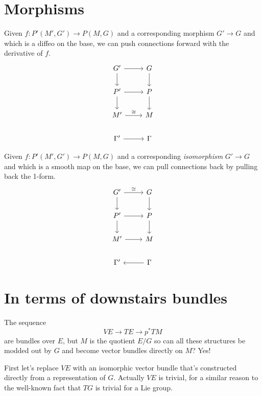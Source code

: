 \documentclass[12pt]{article}
\begin{document}
\section{Morphisms}
Given $f:P'(M', G') \to P(M, G)$ and a corresponding morphism $G'\to G$ and which is a diffeo on the base, we can push connections forward with the derivative of $f$.
\[\begin{tikzcd}
	{G'} & G \\
	{P'} & P \\
	{M'} & M \\
	{\Gamma'} & \Gamma
	\arrow[from=2-1, to=2-2]
	\arrow["\cong", from=3-1, to=3-2]
	\arrow[from=2-1, to=3-1]
	\arrow[from=2-2, to=3-2]
	\arrow[from=1-1, to=2-1]
	\arrow[from=1-2, to=2-2]
	\arrow[from=1-1, to=1-2]
	\arrow[from=4-1, to=4-2]
\end{tikzcd}\]

Given $f:P'(M', G') \to P(M, G)$ and a corresponding \emph{isomorphism} $G'\to G$ and which is a smooth map on the base, we can pull connections back by pulling back the 1-form.
\[\begin{tikzcd}
	{G'} & G \\
	{P'} & P \\
	{M'} & M \\
	{\Gamma'} & \Gamma
	\arrow[from=2-1, to=2-2]
	\arrow[from=3-1, to=3-2]
	\arrow[from=2-1, to=3-1]
	\arrow[from=2-2, to=3-2]
	\arrow[from=1-1, to=2-1]
	\arrow[from=1-2, to=2-2]
	\arrow["\cong", from=1-1, to=1-2]
	\arrow[from=4-2, to=4-1]
\end{tikzcd}\]


\section{In terms of downstairs bundles}
The sequence $$VE\to TE\to p^*TM$$ are bundles over $E$, but $M$ is the quotient $E/G$ so can all these structures be modded out by $G$ and become vector bundles directly on $M$? Yes!

First let's replace $VE$ with an isomorphic vector bundle that's constructed directly from a representation of $G$. Actually $VE$ is trivial, for a similar reason to the well-known fact that $TG$ is trivial for a Lie group.
\end{document}
